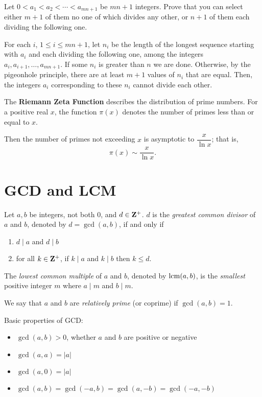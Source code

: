 \begin{exercise}
Let $0<a_1<a_2<\cdots<a_{mn+1}$ be $mn+1$ integers. Prove that you can select either $m+1$ of them no one of which divides any other, or $n+1$ of them each dividing the following one.
\end{exercise}

\begin{solution}
For each $i$, $1\le i\le mn+1$, let $n_i$ be the length of the longest sequence starting with $a_i$ and each dividing the following one, among the integers $a_i,a_{i+1},\dots,a_{mn+1}$. If some $n_i$ is greater than $n$ we are done. Otherwise, by the pigeonhole principle, there are at least $m+1$ values of $n_i$ that are equal. Then, the integers $a_i$ corresponding to these $n_i$ cannot divide each other.
\end{solution}

\begin{theorem}
The \textbf{Riemann Zeta Function} describes the distribution of prime numbers. For a positive real $x$, the function $\pi(x)$ denotes the number of primes less than or equal to $x$.

Then the number of primes not exceeding $x$ is asymptotic to $\dfrac{x}{\ln x}$; that is,
\[\pi(x)\sim\frac{x}{\ln x}.\]
\end{theorem}

\section{GCD and LCM}
\begin{definition}
Let $a,b$ be integers, not both $0$, and $d\in\mathbf Z^+$. $d$ is the \emph{greatest common divisor} of $a$ and $b$, denoted by $d=\gcd(a,b)$, if and only if 
\begin{enumerate}[label=(\roman*)]
\item $d\mid a$ and $d\mid b$
\item for all $k\in\mathbf Z^+$, if $k\mid a$ and $k\mid b$ then $k\le d$.
\end{enumerate}

The \emph{lowest common multiple} of $a$ and $b$, denoted by $\operatorname*{lcm}(a,b)$, is the \emph{smallest} positive integer $m$ where $a \mid m$ and $b \mid m$.

We say that $a$ and $b$ are \emph{relatively prime} (or coprime) if $\gcd(a,b)=1$.
\end{definition}

Basic properties of GCD:
\begin{itemize}
\item $\gcd(a,b)>0$, whether $a$ and $b$ are positive or negative
\item $\gcd(a,a)=|a|$
\item $\gcd(a,0)=|a|$
\item $\gcd(a,b)=\gcd(-a,b)=\gcd(a,-b)=\gcd(-a,-b)$
\end{itemize}

